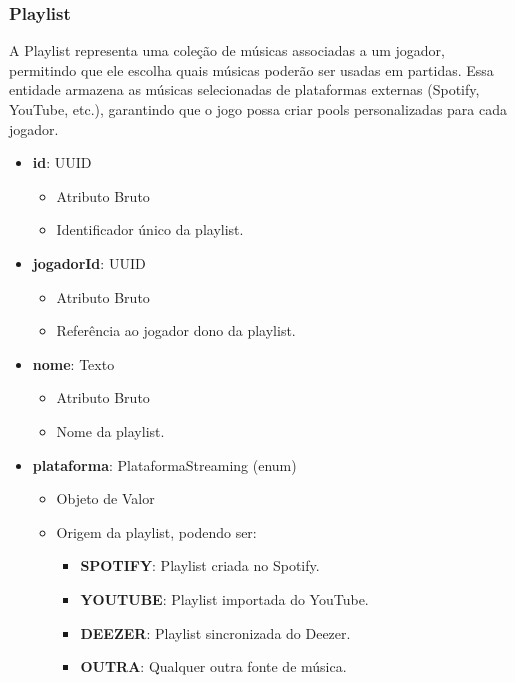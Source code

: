     \subsubsection{Playlist}
    A Playlist representa uma coleção de músicas associadas a um jogador, permitindo que ele escolha quais músicas poderão ser usadas em partidas. Essa entidade armazena as músicas selecionadas de plataformas externas (Spotify, YouTube, etc.), garantindo que o jogo possa criar pools personalizadas para cada jogador.
    \begin{itemize}
        \item \textbf{id}: UUID  
              \begin{itemize}
                  \item Atributo Bruto
                  \item Identificador único da playlist.
              \end{itemize}
    
        \item \textbf{jogadorId}: UUID  
              \begin{itemize}
                  \item Atributo Bruto
                  \item Referência ao jogador dono da playlist.
              \end{itemize}
    
        \item \textbf{nome}: Texto  
              \begin{itemize}
                  \item Atributo Bruto
                  \item Nome da playlist.
              \end{itemize}
    
        \item \textbf{plataforma}: PlataformaStreaming (enum)  
              \begin{itemize}
                  \item Objeto de Valor
                  \item Origem da playlist, podendo ser:
                  \begin{itemize}
                      \item \textbf{SPOTIFY}: Playlist criada no Spotify.
                      \item \textbf{YOUTUBE}: Playlist importada do YouTube.
                      \item \textbf{DEEZER}: Playlist sincronizada do Deezer.
                      \item \textbf{OUTRA}: Qualquer outra fonte de música.
                  \end{itemize}
              \end{itemize}
    

\end{itemize}
